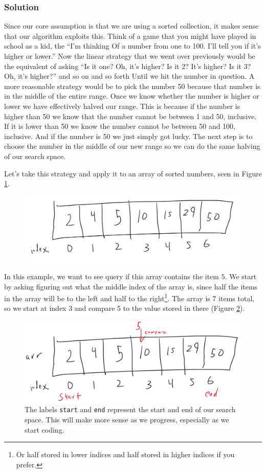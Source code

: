 \subsubsection{Solution}
Since our core assumption is that we are using a sorted collection, it makes sense that our algorithm exploits this.  Think of a game that you might have played in school as a kid, the ``I'm thinking Of a number from one to 100. I'll tell you if it's higher or lower.''  Now the linear strategy that we went over previously would be the equivalent of asking ``Is it one? Oh, it's higher? Is it 2? It's higher? Is it 3? Oh, it's higher?'' and so on and so forth Until we hit the number in question. A more reasonable strategy would be to pick the number 50 because that number is in the middle of the entire range.  Once we know whether the number is higher or lower we have effectively halved our range. This is because if the number is higher than 50 we know that the number cannot be between 1 and 50, inclusive. If it is lower than 50 we know the number cannot be between 50 and 100, inclusive.   And if the number is 50 we just simply got lucky.
The next step is to choose the number in the middle of our new range so we can do the same halving of our search space.

Let's take this strategy and apply it to an array of sorted numbers, seen in Figure \ref{fig:binarysearch1}.

 
\begin{figure}[h!]
	\centering
	\includegraphics[width=0.7\linewidth]{pics/binarySearch1}
	\caption{}
	\label{fig:binarysearch1}
\end{figure}


In this example, we want to see query if this array contains the item $5.$   We start by asking figuring out what the middle index of the array is, since half the items in the array will be to the left and half to the right\footnote{Or half stored in lower indices and half stored in higher indices if you prefer.}.  The array is 7 items total, so we start at index 3  and compare 5 to the value stored in there (Figure \ref{fig:binarysearch2}).

\begin{figure}[h!]
	\centering
	\includegraphics[width=0.7\linewidth]{pics/binarySearch2}
	\caption{The labels \texttt{start} and \texttt{end} represent the start and end of our search space.  This will make more sense as we progress, especially as we start coding.}
	\label{fig:binarysearch2}
\end{figure}

